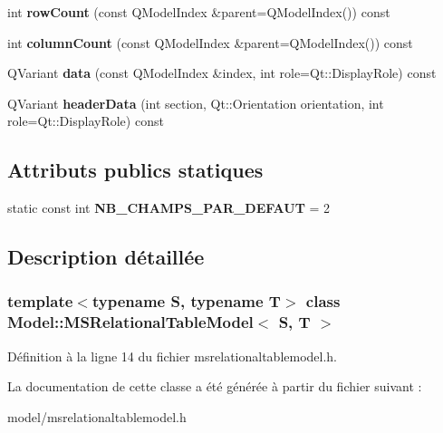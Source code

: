 \begin{DoxyCompactItemize}
\item 
\hypertarget{class_model_1_1_m_s_relational_table_model_aea32363f52756c4994b6b3f36d20aeeb}{
int {\bfseries rowCount} (const QModelIndex \&parent=QModelIndex()) const }
\label{dc/d52/class_model_1_1_m_s_relational_table_model_aea32363f52756c4994b6b3f36d20aeeb}

\item 
\hypertarget{class_model_1_1_m_s_relational_table_model_a5c6697b029ea56da41a75cb85efa8dfa}{
int {\bfseries columnCount} (const QModelIndex \&parent=QModelIndex()) const }
\label{dc/d52/class_model_1_1_m_s_relational_table_model_a5c6697b029ea56da41a75cb85efa8dfa}

\item 
\hypertarget{class_model_1_1_m_s_relational_table_model_abfa820b5069fd8518e916395103b3d8d}{
QVariant {\bfseries data} (const QModelIndex \&index, int role=Qt::DisplayRole) const }
\label{dc/d52/class_model_1_1_m_s_relational_table_model_abfa820b5069fd8518e916395103b3d8d}

\item 
\hypertarget{class_model_1_1_m_s_relational_table_model_afe6d20c15871c4e6975010744e62994f}{
QVariant {\bfseries headerData} (int section, Qt::Orientation orientation, int role=Qt::DisplayRole) const }
\label{dc/d52/class_model_1_1_m_s_relational_table_model_afe6d20c15871c4e6975010744e62994f}

\end{DoxyCompactItemize}
\subsection*{Attributs publics statiques}
\begin{DoxyCompactItemize}
\item 
\hypertarget{class_model_1_1_m_s_relational_table_model_ad678554e1d2597c4c9e8e04f7893fa9c}{
static const int {\bfseries NB\_\-CHAMPS\_\-PAR\_\-DEFAUT} = 2}
\label{dc/d52/class_model_1_1_m_s_relational_table_model_ad678554e1d2597c4c9e8e04f7893fa9c}

\end{DoxyCompactItemize}


\subsection{Description détaillée}
\subsubsection*{template$<$typename S, typename T$>$ class Model::MSRelationalTableModel$<$ S, T $>$}



Définition à la ligne 14 du fichier msrelationaltablemodel.h.



La documentation de cette classe a été générée à partir du fichier suivant :\begin{DoxyCompactItemize}
\item 
model/msrelationaltablemodel.h\end{DoxyCompactItemize}
